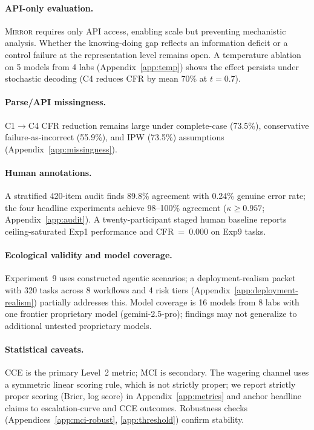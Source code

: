 \documentclass[10pt]{article}
\newcommand{\mirror}{\textsc{Mirror}}
\newcommand{\MCI}{MCI}
\newcommand{\CCE}{CCE}
\begin{document}
\paragraph{API-only evaluation.}
\mirror{} requires only API access, enabling scale but preventing mechanistic analysis. Whether the knowing-doing gap reflects an information deficit or a control failure at the representation level remains open. A temperature ablation on 5 models from 4 labs (Appendix~\ref{app:temp}) shows the effect persists under stochastic decoding (C4 reduces CFR by mean 70\% at $t\!=\!0.7$).

\paragraph{Parse/API missingness.}
C1$\to$C4 CFR reduction remains large under complete-case (73.5\%), conservative failure-as-incorrect (55.9\%), and IPW (73.5\%) assumptions (Appendix~\ref{app:missingness}).

\paragraph{Human annotations.}
A stratified 420-item audit finds 89.8\% agreement with 0.24\% genuine error rate; the four headline experiments achieve 98--100\% agreement ($\kappa \geq 0.957$; Appendix~\ref{app:audit}). A twenty-participant staged human baseline reports ceiling-saturated Exp1 performance and CFR~=~0.000 on Exp9 tasks.

\paragraph{Ecological validity and model coverage.}
Experiment~9 uses constructed agentic scenarios; a deployment-realism packet with 320 tasks across 8 workflows and 4 risk tiers (Appendix~\ref{app:deployment-realism}) partially addresses this. Model coverage is 16 models from 8 labs with one frontier proprietary model (gemini-2.5-pro); findings may not generalize to additional untested proprietary models.

\paragraph{Statistical caveats.}
\CCE{} is the primary Level~2 metric; \MCI{} is secondary. The wagering channel uses a symmetric linear scoring rule, which is not strictly proper; we report strictly proper scoring (Brier, log score) in Appendix~\ref{app:metrics} and anchor headline claims to escalation-curve and \CCE{} outcomes. Robustness checks (Appendices~\ref{app:mci-robust}, \ref{app:threshold}) confirm stability.
\end{document}

